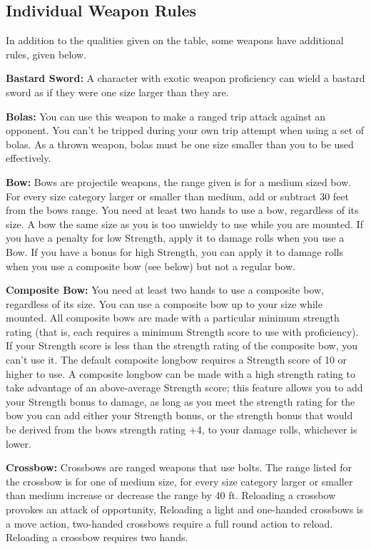 \afterpage{}

\subsection{Individual Weapon Rules}

In addition to the qualities given on the table, some weapons have additional rules, given below.

\textbf{Bastard Sword:} A character with exotic weapon proficiency can wield a bastard sword as if they were one size larger than they are.

\textbf{Bolas:} You can use this weapon to make a ranged trip attack against an opponent. You can't be tripped during your own trip attempt when using a set of bolas. As a thrown weapon, bolas must be one size smaller than you to be used effectively.

\textbf{Bow:} Bows are projectile weapons, the range given is for a medium sized bow. For every size category larger or smaller than medium, add or subtract 30 feet from the bows range. You need at least two hands to use a bow, regardless of its size. A bow the same size as you is too unwieldy to use while you are mounted. If you have a penalty for low Strength, apply it to damage rolls when you use a Bow. If you have a bonus for high Strength, you can apply it to damage rolls when you use a composite bow (see below) but not a regular bow.

\textbf{Composite Bow:} You need at least two hands to use a composite bow, regardless of its size. You can use a composite bow up to your size while mounted. All composite bows are made with a particular minimum strength rating (that is, each requires a minimum Strength score to use with proficiency). If your Strength score is less than the strength rating of the composite bow, you can't use it. The default composite longbow requires a Strength score of 10 or higher to use. A composite longbow can be made with a high strength rating to take advantage of an above-average Strength score; this feature allows you to add your Strength bonus to damage, as long as you meet the strength rating for the bow you can add either your Strength bonus, or the strength bonus that would be derived from the bows strength rating +4, to your damage rolls, whichever is lower.

\textbf{Crossbow:} Crossbows are ranged weapons that use bolts. The range listed for the crossbow is for one of medium size, for every size category larger or smaller than medium increase or decrease the range by 40 ft. Reloading a crossbow provokes an attack of opportunity, Reloading a light and one-handed crossbows is a move action, two-handed crossbows require a full round action to reload. Reloading a crossbow requires two hands.

